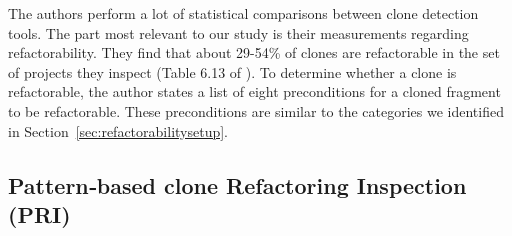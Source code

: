 The authors perform a lot of statistical comparisons between clone detection tools. The part most relevant to our study is their measurements regarding refactorability. They find that about 29-54\% of clones are refactorable in the set of projects they inspect (Table 6.13 of \cite{alwaqfi2017refactoring}). To determine whether a clone is refactorable, the author states a list of eight preconditions for a cloned fragment to be refactorable. These preconditions are similar to the categories we identified in Section~\ref{sec:refactorabilitysetup}.

\subsection{Pattern‐based clone Refactoring Inspection (PRI)}

